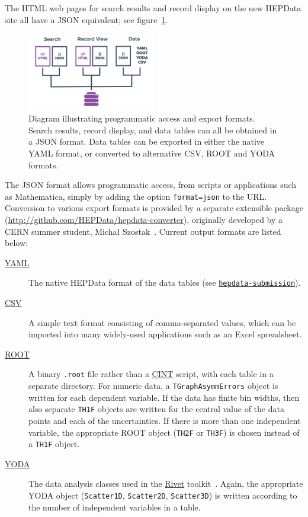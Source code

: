 \documentclass[a4paper]{jpconf}
\begin{document}
The HTML web pages for search results and record display on the new HEPData
site all have a JSON equivalent; see figure~\ref{fig:programmatic}.
%
\begin{figure}
  \begin{center}
    \includegraphics[width=0.5\textwidth]{Figures/programmatic_content.pdf}
    \hspace{2pc}%
    \begin{minipage}[b]{14pc}
      \caption{\label{fig:programmatic}Diagram illustrating programmatic access
and export formats.  Search results, record display, and data tables can all be
obtained in a JSON format.  Data tables can be exported in either the native
YAML format, or converted to alternative CSV, ROOT and YODA formats.}
    \end{minipage}
  \end{center}
\end{figure}
%
The JSON format allows programmatic access, from scripts or applications such
as Mathematica, simply by adding the option \texttt{format=json} to the URL.
 Conversion to various export formats is provided by a separate extensible
package (\url{http://github.com/HEPData/hepdata-converter}), originally
developed by a CERN summer student, Micha\l{} Szostak~\cite{Szostak:2055193}.
Current output formats are listed below:
%
\begin{description}
\item [\href{http://yaml.org}{YAML}] The native HEPData format of the data
tables (see \href{http://github.com/HEPData/hepdata-submission}{\texttt{hepdata-submission}}).
\item [\href{https://en.wikipedia.org/wiki/Comma-separated_values}{CSV}] A
simple text format consisting of comma-separated values, which can be imported
into many widely-used applications such as an Excel spreadsheet.
\item [\href{https://root.cern.ch}{ROOT}] A binary \texttt{.root} file rather
than a \href{https://root.cern.ch/cint}{CINT} script, with each table in a
separate directory.  For numeric data, a \texttt{TGraphAsymmErrors} object is
written for each dependent variable.  If the data has finite bin widths, then
also separate \texttt{TH1F} objects are written for the central value of the
data points and each of the uncertainties.  If there is more than one
independent variable, the appropriate ROOT object (\texttt{TH2F} or
\texttt{TH3F}) is chosen instead of a \texttt{TH1F} object.
\item [\href{https://yoda.hepforge.org}{YODA}] The data analysis classes used
in the \href{https://rivet.hepforge.org}{Rivet} toolkit~\cite{Buckley:2010ar}.
 Again, the appropriate YODA object (\texttt{Scatter1D}, \texttt{Scatter2D},
\texttt{Scatter3D}) is written according to the number of independent variables
in a table.
\end{description}
\end{document}
